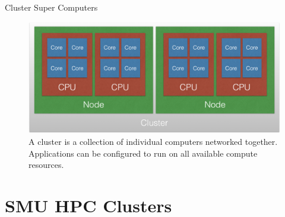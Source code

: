 %

\begin{frame}{Cluster Super Computers}
\begin{figure}
  \centering
  \includegraphics[width=0.75\linewidth]{figures/cluster.png}
  \caption{A cluster is a collection of individual computers networked together. Applications can be configured to run on all available compute resources.}
\end{figure}
\end{frame}

\section{SMU HPC Clusters}


